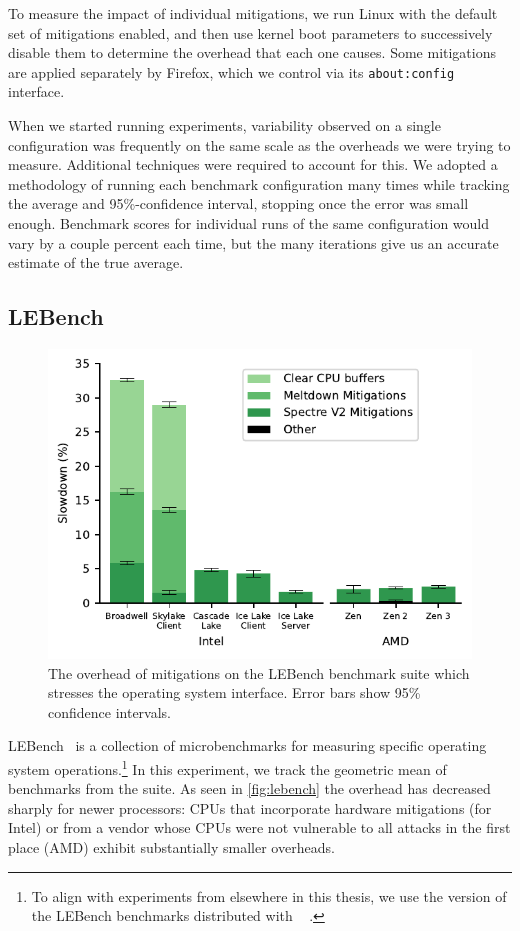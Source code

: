 To measure the impact of individual mitigations, we run  Linux with the default set of mitigations enabled, and then use kernel boot parameters to successively disable them to determine the overhead that each one causes.
Some mitigations are applied separately by Firefox, which we control via its \texttt{about:config} interface.

When we started running experiments, variability observed on a single configuration was frequently on the same scale as the overheads we were trying to measure.
Additional techniques were required to account for this.
We adopted a methodology of running each benchmark configuration many times while tracking the average and 95\%-confidence interval, stopping once the error was small enough.
Benchmark scores for individual runs of the same configuration would vary by a couple percent each time, but the many iterations give us an accurate estimate of the true average.

\subsection{LEBench}
\label{sec:benchmarks:lebench}

\begin{figure}[h]
    \includegraphics[width=\columnwidth]{plots/lebench.pdf}
    \caption{The overhead of mitigations on the LEBench benchmark suite which stresses the operating system interface. Error bars show 95\% confidence intervals.}
    \label{fig:lebench}
\end{figure}


LEBench~\cite{ren:lebench} is a collection of microbenchmarks for measuring specific operating system operations.\footnote{To align with experiments from elsewhere in this thesis, we use the version of the LEBench benchmarks distributed with \sys~\cite{behrens:ward} .}
In this experiment, we track the geometric mean of benchmarks from the suite.
As seen in \autoref{fig:lebench} the overhead has decreased sharply for newer processors:
CPUs that incorporate hardware mitigations (for Intel) or from a vendor whose CPUs were not vulnerable to all attacks in the first place (AMD) exhibit substantially smaller overheads.

